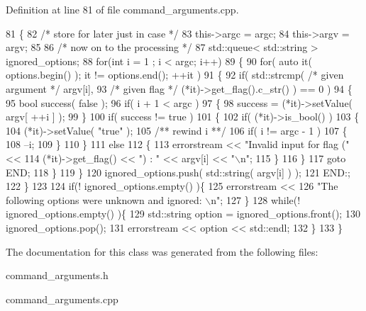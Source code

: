 Definition at line 81 of file command\+\_\+arguments.\+cpp.


\begin{DoxyCode}
81                                               \{
82    \textcolor{comment}{/* store for later just in case */}
83    this->argc = argc;
84    this->argv = argv;
85 
86    \textcolor{comment}{/* now on to the processing */}
87    std::queue< std::string > ignored\_options;
88    \textcolor{keywordflow}{for}(\textcolor{keywordtype}{int} i = 1 ; i < argc; i++)
89    \{
90       \textcolor{keywordflow}{for}( \textcolor{keyword}{auto} it( options.begin() ); it != options.end(); ++it )
91       \{
92        \textcolor{keywordflow}{if}( std::strcmp( \textcolor{comment}{/* given argument */} argv[i],
93                         \textcolor{comment}{/* given flag     */} (*it)->get\_flag().c\_str() ) == 0 )
94          \{
95             \textcolor{keywordtype}{bool} success( \textcolor{keyword}{false} );
96             \textcolor{keywordflow}{if}( i + 1 < argc )
97             \{
98                success = (*it)->setValue( argv[ ++i ] );
99             \}
100             \textcolor{keywordflow}{if}( success != \textcolor{keyword}{true} )
101             \{
102                \textcolor{keywordflow}{if}( (*it)->is\_bool() )
103                \{
104                   (*it)->setValue( \textcolor{stringliteral}{"true"} );\textcolor{comment}{}
105 \textcolor{comment}{                  /** rewind i **/}
106                   \textcolor{keywordflow}{if}( i != argc - 1 )
107                   \{
108                      --i;
109                   \}
110                \}
111                \textcolor{keywordflow}{else}
112                \{
113                   errorstream << \textcolor{stringliteral}{"Invalid input for flag ("} <<
114                    (*it)->get\_flag() << \textcolor{stringliteral}{") : "} << argv[i] << \textcolor{stringliteral}{"\(\backslash\)n"};
115                \}
116             \}
117             \textcolor{keywordflow}{goto} END;
118          \}
119     \}
120       ignored\_options.push( std::string( argv[i] ) );
121       END:;
122    \}
123    
124    \textcolor{keywordflow}{if}(! ignored\_options.empty() )\{
125       errorstream << 
126          \textcolor{stringliteral}{"The following options were unknown and ignored: \(\backslash\)n"};
127    \}
128    \textcolor{keywordflow}{while}(! ignored\_options.empty() )\{
129       std::string option = ignored\_options.front();
130       ignored\_options.pop();
131       errorstream << option << std::endl;
132    \}
133 \}
\end{DoxyCode}


The documentation for this class was generated from the following files\+:\begin{DoxyCompactItemize}
\item 
command\+\_\+arguments.\+h\item 
command\+\_\+arguments.\+cpp\end{DoxyCompactItemize}
